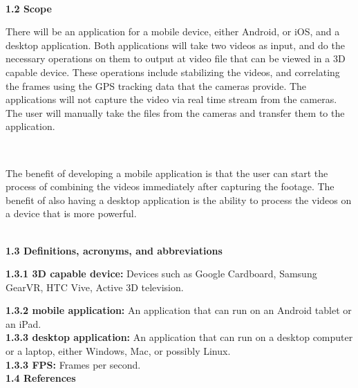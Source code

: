 \documentclass[10pt,draftclsnofoot,onecolumn]{IEEEtran}
\begin{document}
\\
\vspace{5mm}
{\Medium\textbf{1.2 Scope}}\\
\vspace{5mm}

There will be an application for a mobile device, either Android, or iOS, and a desktop application. Both applications will take two videos as input, and do the necessary operations on them to output at video file that can be viewed in a 3D capable device. These operations include stabilizing the videos, and correlating the frames using the GPS tracking data that the cameras provide. The applications will not capture the video via real time stream from the cameras. The user will manually take the files from the cameras and transfer them to the application. 

 \\
\vspace{5mm}

The benefit of developing a mobile application is that the user can start the process of combining the videos immediately after capturing the footage. The benefit of also having a desktop application is the ability to process the videos on a device that is more powerful. \\
 
 \\ 
\vspace{5mm}

{\Medium\textbf{1.3 Definitions, acronyms, and abbreviations}}\\
\vspace{5mm}

\textbf{1.3.1 3D capable device:}   Devices such as Google Cardboard, Samsung GearVR, HTC Vive,  Active 3D television.
 \vspace{5mm}

\textbf{1.3.2 mobile application:}   An application that can run on an Android tablet or an iPad.\\
 \vspace{5mm}
\textbf{1.3.3 desktop application:}   An application that can run on a desktop computer or a laptop, either Windows, Mac, or possibly Linux.
 \vspace{5mm}\\
\textbf{1.3.3 FPS:}   Frames per second. 
 \vspace{5mm}\\
\vspace{5mm}
{\Medium\textbf{1.4 References}}\\
\vspace{5mm}
\end{document}
